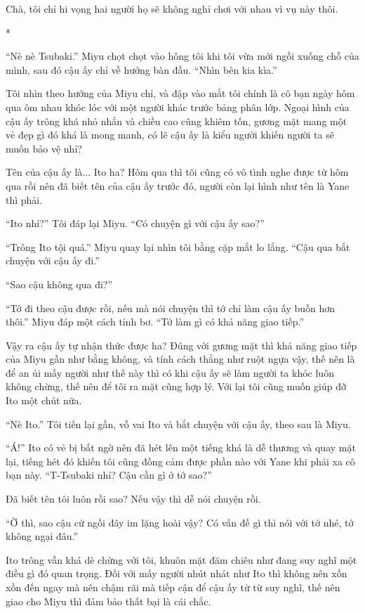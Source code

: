 {Chà, tôi chỉ hi vọng hai người họ sẽ không nghỉ chơi với nhau vì vụ này
thôi.

*

``Nè nè Tsubaki.'' Miyu chọt chọt vào hông tôi khi tôi vừa mới ngồi
xuống chỗ của mình, sau đó cậu ấy chỉ về hướng bàn đầu. ``Nhìn bên kia
kìa.''

Tôi nhìn theo hướng của Miyu chỉ, và đập vào mắt tôi chính là cô bạn
ngày hôm qua ôm nhau khóc lóc với một người khác trước bảng phân lớp.
Ngoại hình của cậu ấy trông khá nhỏ nhắn và chiều cao cũng khiêm tốn,
gương mặt mang một vẻ đẹp gì đó khá là mong manh, có lẽ cậu ấy là kiểu
người khiến người ta sẽ muốn bảo vệ nhỉ?

Tên của cậu ấy là... Ito ha? Hôm qua thì tôi cũng có vô tình nghe được
từ hôm qua rồi nên đã biết tên của cậu ấy trước đó, người còn lại hình
như tên là Yane thì phải.

``Ito nhỉ?'' Tôi đáp lại Miyu. ``Có chuyện gì với cậu ấy sao?''

``Trông Ito tội quá.'' Miyu quay lại nhìn tôi bằng cặp mắt lo lắng.
``Cậu qua bắt chuyện với cậu ấy đi.''

``Sao cậu không qua đi?''

``Tớ đi theo cậu được rồi, nếu mà nói chuyện thì tớ chỉ làm cậu ấy buồn
hơn thôi.'' Miyu đáp một cách tỉnh bơ. ``Tớ làm gì có khả năng giao
tiếp.''

Vậy ra cậu ấy tự nhận thức được ha? Đúng với gương mặt thì khả năng giao
tiếp của Miyu gần như bằng không, và tính cách thẳng như ruột ngựa vậy,
thế nên là để an ủi mấy người như thế này thì có khi cậu ấy sẽ làm người
ta khóc luôn không chừng, thế nên để tôi ra mặt cũng hợp lý. Với lại tôi
cũng muốn giúp đỡ Ito một chút nữa.

``Nè Ito.'' Tôi tiến lại gần, vỗ vai Ito và bắt chuyện với cậu ấy, theo
sau là Miyu.

``Á!'' Ito có vẻ bị bất ngờ nên đã hét lên một tiếng khá là dễ thương và
quay mặt lại, tiếng hét đó khiến tôi cũng đồng cảm được phần nào với
Yane khi phải xa cô bạn này. ``T-Tsubaki nhỉ? Cậu cần gì ở tớ sao?''

Đã biết tên tôi luôn rồi sao? Nếu vậy thì dễ nói chuyện rồi.

``Ờ thì, sao cậu cứ ngồi đây im lặng hoài vậy? Có vấn đề gì thì nói với
tớ nhé, tớ không ngại đâu.''

Ito trông vẫn khá dè chừng với tôi, khuôn mặt đăm chiêu như đang suy
nghĩ một điều gì đó quan trọng. Đối với mấy người nhút nhát như Ito thì
không nên xồn xồn đến ngay mà nên chậm rãi mà tiếp cận để cậu ấy từ từ
suy nghĩ, thế nên giao cho Miyu thì đảm bảo thất bại là cái chắc.

}

